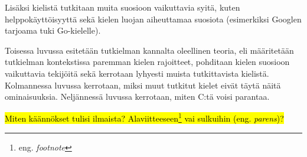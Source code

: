 Lisäksi kielistä tutkitaan muita suosioon vaikuttavia syitä, kuten
helppokäyttöisyyttä sekä kielen luojan aiheuttamaa suosiota (esimerkiksi
Googlen tarjoama tuki Go-kielelle).

Toisessa luvussa esitetään tutkielman kannalta oleellinen teoria, eli
määritetään tutkielman kontekstissa paremman kielen rajoitteet, pohditaan
kielen suosioon vaikuttavia tekijöitä sekä kerrotaan lyhyesti muista
tutkittavista kielistä. Kolmannessa luvussa kerrotaan, miksi muut tutkitut
kielet eivät täytä näitä ominaisuuksia. Neljännessä luvussa kerrotaan, miten
C:tä voisi parantaa.

\hl{Miten käännökset tulisi ilmaista? Alaviitteeseen\footnote{eng. \emph{footnote}} vai
sulkuihin (eng. \emph{parens})?}
